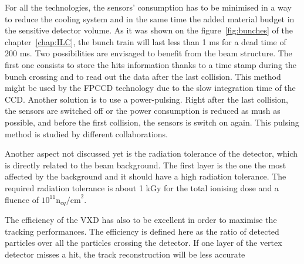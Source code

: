    For all the technologies, the sensors' consumption has to be minimised in a way to reduce the cooling system and in the same time the added material budget in the sensitive detector volume.
   As it was shown on the figure~\ref{fig:bunches} of the chapter~\ref{chap:ILC}, the bunch train will last less than 1 ms for a dead time of 200 ms.
   Two possibilities are envisaged to benefit from the beam structure.
   The first one consists to store the hits information thanks to a time stamp during the bunch crossing and to read out the data after the last collision.
   This method might be used by the \gls{FPCCD} technology due to the slow integration time of the \gls{CCD}.
   Another solution is to use a power-pulsing.
   Right after the last collision, the sensors are switched off or the power consumption is reduced as mush as possible, and before the first collision, the sensors is switch on again.
   This pulsing method is studied by different collaborations. 
   
   Another aspect not discussed yet is the radiation tolerance of the detector, which is directly related to the beam background.
   The first layer is the one the most affected by the background and it should have a high radiation tolerance. 
   The required radiation tolerance is about 1 kGy for the total ionising dose and a fluence of $10^{11}\text{n}_{eq}\text{/cm}^2$\cite{Behnke2013}.

   The efficiency of the \gls{VXD} has also to be excellent in order to maximise the tracking performances.
   The efficiency is defined here as the ratio of detected particles over all the particles crossing the detector.
   If one layer of the vertex detector misses a hit, the track reconstruction will be less accurate 
   
  
   
   


